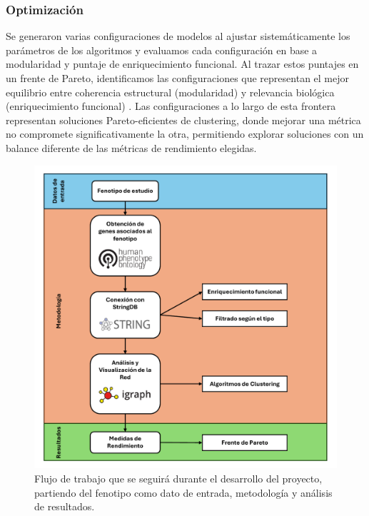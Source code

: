 \subsubsection*{Optimización}
Se generaron varias configuraciones de modelos al ajustar sistemáticamente los parámetros de los algoritmos y evaluamos cada configuración en base a modularidad y puntaje de enriquecimiento funcional. Al trazar estos puntajes en un frente de Pareto, identificamos las configuraciones que representan el mejor equilibrio entre coherencia estructural (modularidad) y relevancia biológica (enriquecimiento funcional) \cite{goodarzi2014PARETOFRONT1,jahan2013multiPARETOFRONT2,costa2015paretoPARETOFRONT3}. Las configuraciones a lo largo de esta frontera representan soluciones Pareto-eficientes de clustering, donde mejorar una métrica no compromete significativamente la otra, permitiendo explorar soluciones con un balance diferente de las métricas de rendimiento elegidas.


\begin{figure}[h]
	\centering
	\includegraphics[width=1\linewidth]{figures/methods/Flujo_de_trabajo.pdf}
	\caption{Flujo de trabajo que se seguirá durante el desarrollo del proyecto, partiendo del fenotipo como dato de entrada, metodología y análisis de resultados.}
	\label{fig:flujo_trabajo}
\end{figure}

